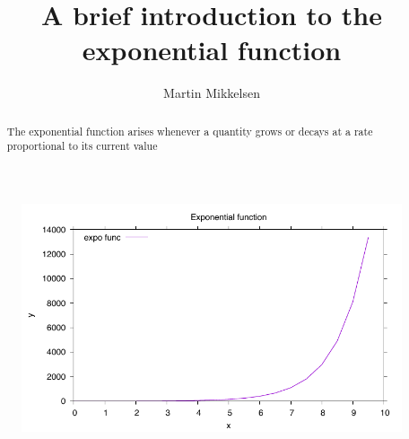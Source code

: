 \documentclass{article}
\title{A brief introduction to the exponential function}
\author{Martin Mikkelsen}
\date{}
\begin{document}
\maketitle
\begin{abstract}
The exponential function arises whenever a quantity grows or decays at a rate proportional to its current value\end{abstract}
\begin{figure}[h]
\includegraphics[width=\textwidth]{expo.pdf}
\end{figure}
\end{document}
